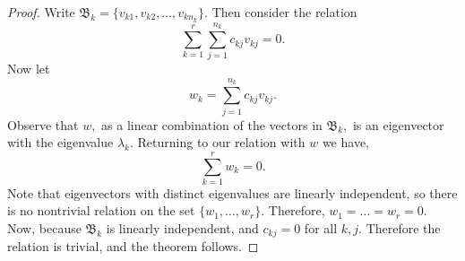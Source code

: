 \begin{proof}
    Write $\mathfrak{B}_k = \{v_{k1},v_{k2},\ldots,v_{kn_k}\}.$ Then consider the relation $$\sum\limits_{k=1}^{r} \sum\limits_{j=1}^{n_k} c_{kj}v_{kj} = 0.$$ Now let $$w_k = \sum\limits_{j=1}^{n_k} c_{kj}v_{kj}.$$ Observe that $w,$ as a linear combination of the vectors in $\mathfrak{B}_k,$ is an eigenvector with the eigenvalue $\lambda_k.$ Returning to our relation with $w$ we have, $$\sum\limits_{k=1}^{r} w_k = 0.$$ Note that eigenvectors with distinct eigenvalues are linearly independent, so there is no nontrivial relation on the set $\{w_1,\ldots,w_r\}.$ Therefore, $w_1=\ldots=w_r=0.$ Now, because $\mathfrak{B}_k$ is linearly independent, and $c_{kj}=0$ for all $k,j.$ Therefore the relation is trivial, and the theorem follows.
\end{proof}